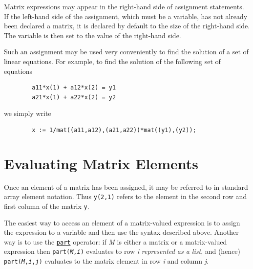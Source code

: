 Matrix expressions may appear in the right-hand side of assignment
statements. If the left-hand side of the assignment, which must be a
variable, has not already been declared a matrix, it is declared by default
to the size of the right-hand side. The variable is then set to the value
of the right-hand side.

Such an assignment may be used very conveniently to find the solution of a
set of linear equations. For example, to find the solution of the
following set of equations
\begin{verbatim}
        a11*x(1) + a12*x(2) = y1
        a21*x(1) + a22*x(2) = y2
\end{verbatim}
we simply write
\begin{verbatim}
        x := 1/mat((a11,a12),(a21,a22))*mat((y1),(y2));
\end{verbatim}

\section{Evaluating Matrix Elements}

Once an element of a matrix has been assigned, it may be referred to in
standard array element notation.  Thus \texttt{y(2,1)} refers to the element
in the second row and first column of the matrix \texttt{y}.

The easiest way to access an element of a matrix-valued expression is
to assign the expression to a variable and then use the syntax
described above.  Another way is to use the
\hyperlink{operator:PART}{\texttt{part}} operator: if \emph{M} is
either a matrix or a matrix-valued expression then
\texttt{part(\emph{M},\emph{i})} evaluates to row \emph{i}
\emph{represented as a list}, and (hence)
\texttt{part(\emph{M},\emph{i},\emph{j})} evaluates to the matrix
element in row \emph{i} and column \emph{j}.

